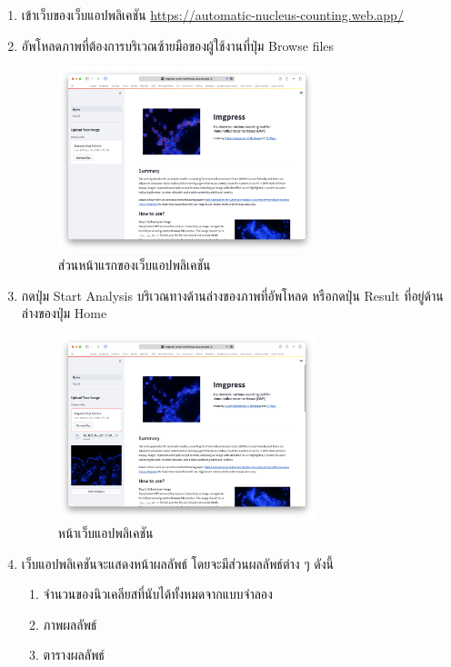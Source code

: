 \documentclass[12pt,oneside,openright,a4paper]{cpe-thai-project}
\begin{document}
\begin{enumerate}
    \item เข้าเว็บของเว็บแอปพลิเคชัน \url{https://automatic-nucleus-counting.web.app/}
    \item อัพโหลดภาพที่ต้องการบริเวณซ้ายมือของผู้ใช้งานที่ปุ่ม Browse files
    \begin{figure}[!h]
        \centering
        \includegraphics[width=7.5cm]{images/homepage.png}
        \caption{ส่วนหน้าแรกของเว็บแอปพลิเคชัน}
        \label{fig:homepageweb}
    \end{figure}
    \item กดปุ่ม Start Analysis บริเวณทางด้านล่างของภาพที่อัพโหลด หรือกดปุ่น Result ที่อยู่ด้านล่างของปุ่ม Home
    \begin{figure}[!h]
        \centering
        \includegraphics[width=7.5cm]{images/upload_success.png}
        \caption{หน้าเว็บแอปพลิเคชัน}
        \label{fig:homepageweb}
    \end{figure}
    \pagebreak
    \item เว็บแอปพลิเคชันจะแสดงหน้าผลลัพธ์ โดยจะมีส่วนผลลัพธ์ต่าง ๆ ดังนี้
    \begin{enumerate}[!h]
        \item จำนวนของนิวเคลียสที่นับได้ทั้งหมดจากแบบจำลอง
        \item ภาพผลลัพธ์
        \item ตารางผลลัพธ์
    \end{enumerate}
    \begin{figure}[!h]

\end{figure}
\end{enumerate}
\end{document}
